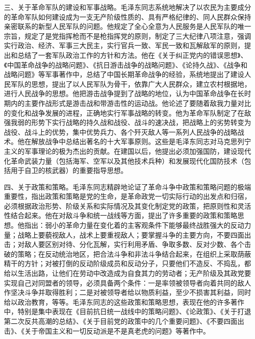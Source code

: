三、关于革命军队的建设和军事战略。毛泽东同志系统地解决了以农民为主要成分的革命军队如何建设成为一支无产阶级性质的、具有严格纪律的、同人民群众保持亲密联系的新型人民军队的问题。他规定了全心全意为人民服务是人民军队的唯一宗旨，规定了是党指挥枪而不是枪指挥党的原则，制定了三大纪律八项注意，强调实行政治、经济、军事三大民主，实行官兵一致、军民一致和瓦解敌军的原则，提出和总结了一套军队政治工作的方针和方法。他在《关于纠正党内的错误思想》、《中国革命战争的战略问题》、《抗日游击战争的战略问题》、《论持久战》、《战争和战略问题》等军事著作中，总结了中国长期革命战争的经验，系统地提出了建设人民军队的思想，提出了以人民军队为骨干，依靠广大人民群众，建立农村根据地，进行人民战争的思想。他把游击战争提到了战略的地位，认为中国革命战争在长时期内的主要作战形式是游击战和带游击性的运动战。他论述了要随着敌我力量对比的变化和战争发展的进程，正确地实行军事战略的转变。他为革命军队制定了在敌强我弱的形势下实行战略的持久战和战役、战斗的速决战，把战略上的劣势转变为战役、战斗上的优势，集中优势兵力、各个歼灭敌人等一系列人民战争的战略战术。他在解放战争中总结出著名的十大军事原则。这些是毛泽东同志对马克思列宁主义的军事理论的极为杰出的贡献。在建国以后，他提出必须加强国防，建设现代化革命武装力量（包括海军、空军以及其他技术兵种）和发展现代化国防技术（包括用于自卫的核武器）的重要指导思想。

四、关于政策和策略。毛泽东同志精辟地论证了革命斗争中政策和策略问题的极端重要性，指出政策和策略是党的生命，是革命政党一切实际行动的出发点和归宿，必须根据政治形势、阶级关系和实际情况及其变化制定党的政策，把原则性和灵活性结合起来。他在对敌斗争和统一战线等方面，提出了许多重要的政策和策略思想。他指出：弱小的革命力量在变化着的主客观条件下能够最终战胜强大的反动力量；战略上要藐视敌人，战术上要重视敌人；要掌握斗争的主要方向，不要四面出击；对敌人要区别对待、分化瓦解，实行利用矛盾、争取多数、反对少数、各个击破的策略；在反动统治地区，把合法斗争和非法斗争结合起来，在组织上采取荫蔽精干的方针；对被打倒的反动阶级成员和反动分子，只要他们不造反、不捣乱，都给以生活出路，让他们在劳动中改造成为自食其力的劳动者；无产阶级及其政党要实现自己对同盟者的领导，必须具备两个条件：一是率领被领导者向着共同的敌人作坚决斗争并取得胜利；二是对被领导者给以物质利益，至少不损害其利益，同时给以政治教育，等等。毛泽东同志的这些政策和策略思想，表现在他的许多著作中，特别是集中表现在《目前抗日统一战线中的策略问题》、《论政策》、《关于打退第二次反共高潮的总结》、《关于目前党的政策中的几个重要问题》、《不要四面出击》、《关于帝国主义和一切反动派是不是真老虎的问题》等著作中。

